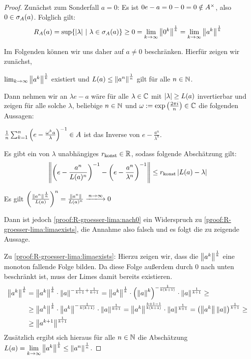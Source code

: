 \begin{proof}Zunächst zum Sonderfall $a = 0$: Es ist $0 e - a = 0 - 0 = 0 \notin A^\times$, also $0 \in \sigma_A(a)$. Folglich gilt:
	\[R_A(a) = \sup\{|\lambda| ~|~ \lambda \in \sigma_A(a)\} \geq 0 = \underset{k\to\infty}{\lim}\left\lVert0^k\right\rVert^\frac{1}{k} = \underset{k\to\infty}{\lim}\left\lVert a^k\right\rVert^\frac{1}{k}\]

Im Folgenden können wir uns daher auf $a \neq 0$ beschränken. Hierfür zeigen wir zunächst,
\begin{proofenum}
	\item \label{proof:R-groesser-lima:limaexists}
		$\lim_{k\to\infty}\left\lVert a^k\right\rVert^\frac{1}{k}$ existiert und $L(a) \leq \left\lVert a^n\right\rVert^\frac{1}{n}$ gilt für alle $n \in \mathbb{N}$.
\setcounter{temp}{\value{proofenumi}}
\end{proofenum}
Dann nehmen wir an $\lambda e - a$ wäre für alle $\lambda \in \mathbb{C}$ mit $|\lambda| \geq L(a)$ invertierbar und zeigen für alle solche $\lambda$, beliebige $n \in \mathbb{N}$ und $\omega := \textup{exp}\left(\frac{2\pi i}{n}\right) \in \mathbb{C}$ die folgenden Aussagen: 
\begin{proofenum}
\setcounter{proofenumi}{\value{temp}}
	\item \label{proof:R-groesser-lima:invertierbar}
		$\frac{1}{n}\sum_{k=1}^n \left(e-\frac{\omega^k a}{\lambda}\right)^{-1} \in A$ ist das Inverse von $e - \frac{a^n}{\lambda^n}$.
	\item \label{proof:R-groesser-lima:abschaetzung}
		Es gibt ein von $\lambda$ unabhängiges $r_\textup{konst} \in \mathbb{R}$, sodass folgende Abschätzung gilt:
		\[\left\lVert\left(e - \frac{a^n}{L(a)^n}\right)^{-1} - \left(e - \frac{a^n}{\lambda^n}\right)^{-1}\right\rVert \leq r_\textup{konst}\left|L(a) - \lambda\right|\]
	\item \label{proof:R-groesser-lima:nach0}
		Es gilt $\left(\frac{\norm{a^n}^\frac{1}{n}}{\lima}\right)^n = \frac{\norm{a^n}}{\lima^n} \xlongrightarrow{n\to\infty} 0$
\end{proofenum}
Dann ist jedoch \ref{proof:R-groesser-lima:nach0} ein Widerspruch zu \ref{proof:R-groesser-lima:limaexists}, die Annahme also falsch und es folgt die zu zeigende Aussage.

Zu \ref{proof:R-groesser-lima:limaexists}: Hierzu zeigen wir, dass die $\left\lVert a^k\right\rVert^\frac{1}{k}$ eine monoton fallende Folge bilden. Da diese Folge außerdem durch $0$ nach unten beschränkt ist, muss der Limes damit bereits existieren.
\begin{align*}
	\left\lVert a^k\right\rVert^\frac{1}{k} &= \left\lVert a^k\right\rVert^\frac{1}{k}\cdot\left\lVert a\right\rVert^{-\frac{1}{k+1}+\frac{1}{k+1}} = \left\lVert a^k\right\rVert^\frac{1}{k}\cdot\left(\left\lVert a\right\rVert^k\right)^{-\frac{1}{k(k+1)}}\cdot\left\lVert a\right\rVert^{\frac{1}{k+1}} \geq \\
	&\geq \left\lVert a^k\right\rVert^\frac{1}{k}\cdot\left\lVert a^k\right\rVert^{-\frac{1}{k(k+1)}}\cdot\left\lVert a\right\rVert^{\frac{1}{k+1}} = \left\lVert a^k\right\rVert^{\frac{k+1-1}{k(k+1)}}\cdot\left\lVert a\right\rVert^{\frac{1}{k+1}} = \left(\left\lVert a^k\right\rVert\left\lVert a\right\rVert\right)^{\frac{1}{k+1}} \geq \\
	&\geq \left\lVert a^{k+1}\right\rVert^\frac{1}{k+1}
	\end{align*}
Zusätzlich ergibt sich hieraus für alle $n \in \mathbb{N}$ die Abschätzung $L(a) = \underset{k\to\infty}{\lim}\left\lVert a^k\right\rVert^\frac{1}{k} \leq \left\lVert a^n\right\rVert^\frac{1}{n}$.


\end{proof}

